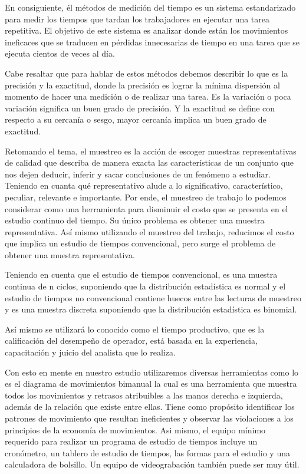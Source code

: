     En consiguiente, él métodos de medición del tiempo es un sistema estandarizado para medir los tiempos que tardan los trabajadores en ejecutar una tarea repetitiva. El objetivo de este sistema es analizar donde están los movimientos ineficaces que se traducen en pérdidas innecesarias de tiempo en una tarea que se ejecuta cientos de veces al día. \cite{DanielGrifol}
    
    Cabe resaltar que para hablar de estos métodos debemos describir lo que es la precisión y la exactitud, donde la precisión es lograr la mínima dispersión al momento de hacer una medición o de realizar una tarea. Es la variación o poca variación significa un buen grado de precisión. Y la exactitud se define con respecto a su cercanía o sesgo, mayor cercanía implica un buen grado de exactitud.
    
    Retomando el tema, el muestreo es la acción de escoger muestras representativas de calidad que describa de manera exacta las características de un conjunto que nos dejen deducir, inferir y sacar conclusiones de un fenómeno a estudiar. \cite{RAE} Teniendo en cuanta qué representativo alude a lo significativo, característico, peculiar, relevante e importante. \cite{RAE}
    Por ende, el muestreo de trabajo lo podemos considerar como una herramienta para disminuir el costo que se presenta  en el estudio continuo del tiempo. Su único problema es obtener una muestra representativa. Así mismo utilizando el muestreo del trabajo, reducimos el costo que implica un estudio de tiempos convencional, pero surge el problema de obtener una muestra representativa.
    
    Teniendo en cuenta que el estudio de tiempos convencional, es una muestra continua de n ciclos, suponiendo que la distribución estadística es normal y el estudio de tiempos no convencional contiene huecos entre las lecturas de muestreo y es una muestra discreta suponiendo que la distribución estadística es binomial.
    
    
    Así mismo se utilizará lo conocido como el tiempo productivo, que es la calificación del desempeño de operador, está basada en la experiencia, capacitación y juicio del analista que lo realiza.
    
    
    Con esto en mente en nuestro estudio utilizaremos diversas herramientas como lo es el diagrama de movimientos bimanual la cual es una herramienta que muestra todos los movimientos y retrasos atribuibles a las manos derecha e izquierda, además de la relación que existe entre ellas. Tiene como propósito identificar los patrones de movimiento que resultan ineficientes y observar las violaciones a los principios de la economía de movimientos.\cite{niebel1980ingenieria} Asi mismo, el equipo mínimo requerido para realizar un programa de estudio de tiempos incluye un cronómetro, un tablero de estudio de tiempos, las formas para el estudio y una calculadora de bolsillo. Un equipo de videograbación también puede ser muy útil.
    
